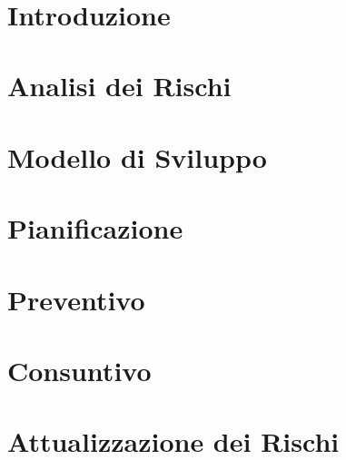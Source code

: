 \documentclass[12pt, a4paper,table]{article}
\title{\textsc{\docNome}}
\author{}
\date{}
\begin{document}


\tableofcontents
\newpage
\section{Introduzione}
    
\section{Analisi dei Rischi}
      
\section{Modello di Sviluppo}
      
\section{Pianificazione}
      
      
      
      
\section{Preventivo}
      
      
      
\section{Consuntivo}
      
      
      
      
      \newpage
\section{Attualizzazione dei Rischi}
      
\end{document}
